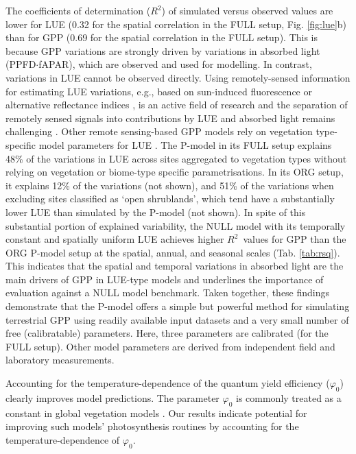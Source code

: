 \documentclass[gmd, manuscript]{copernicus}
\newcommand{\rsq}{$R^2$}
\begin{document}
The coefficients of determination (\rsq ) of simulated versus observed values are lower for LUE (0.32 for the spatial correlation in the FULL setup, Fig. \ref{fig:lue}b) than for GPP (0.69 for the spatial correlation in the FULL setup). This is because GPP variations are strongly driven by variations in absorbed light (PPFD$\cdot$fAPAR), which are observed and used for modelling. In contrast, variations in LUE cannot be observed directly. Using remotely-sensed information for estimating LUE variations, e.g., based on sun-induced fluorescence \citep{frankenberg18, li18gcb, ryu19rse} or alternative reflectance indices \citep{gamon92, gamon16pnas, Badgley2017-tw}, is an active field of research and the separation of remotely sensed signals into contributions by LUE and absorbed light remains challenging \citep{porcarcastell14, ryu19rse}. Other remote sensing-based GPP models rely on vegetation type-specific model parameters for LUE \citep{Zhang2017-yr, running04, jiang16rse}. The P-model in its FULL setup explains 48\% of the variations in LUE across sites aggregated to vegetation types without relying on vegetation or biome-type specific parametrisations. In its ORG setup, it explains 12\% of the variations (not shown), and 51\% of the variations when excluding sites classified as `open shrublands', which tend have a substantially lower LUE than simulated by the P-model (not shown). In spite of this substantial portion of explained variability, the NULL model with its temporally constant and spatially uniform LUE achieves higher \rsq\ values for GPP than the ORG P-model setup at the spatial, annual, and seasonal scales (Tab. \ref{tab:rsq}). This indicates that the spatial and temporal variations in absorbed light are the main drivers of GPP in LUE-type models and underlines the importance of evaluation against a NULL model benchmark. Taken together, these findings demonstrate that the P-model offers a simple but powerful method for simulating terrestrial GPP using readily available input datasets and a very small number of free (calibratable) parameters. Here, three parameters are calibrated (for the FULL setup). Other model parameters are derived from independent field and laboratory measurements.


Accounting for the temperature-dependence of the quantum yield efficiency ($\varphi_0$) clearly improves model predictions. The parameter $\varphi_0$ is commonly treated as a constant in global vegetation models \citep{rogers17}. Our results indicate potential for improving such models' photosynthesis routines by accounting for the temperature-dependence of $\varphi_0$. 
\end{document}

